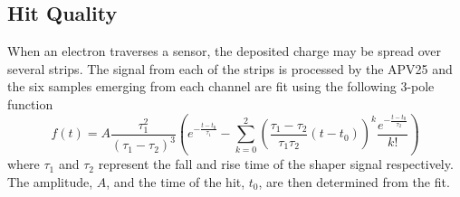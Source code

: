 \subsection{Hit Quality}

When an electron traverses a sensor, the deposited charge may be spread over
several strips.  The signal from each of the strips is processed by the
APV25 and the six samples emerging from each channel are fit using the 
following 3-pole function
\begin{equation}
    f(t) = A\frac{\tau_1^2}{(\tau_1 - \tau_2)^3}\left( e^{-\frac{t-t_{0}}{\tau_1}}
        - \sum_{k=0}^2 \left(\frac{\tau_1 - \tau_2}{\tau_1\tau_2}(t-t_{0})\right)^k
        \frac{e^{-\frac{t-t_{0}}{\tau_2}}}{k!} \right)
\end{equation}
where $\tau_1$ and $\tau_2$ represent the fall and rise time of the shaper 
signal respectively.  The amplitude, $A$, and the time of the hit, $t_0$, are then
determined from the fit.

